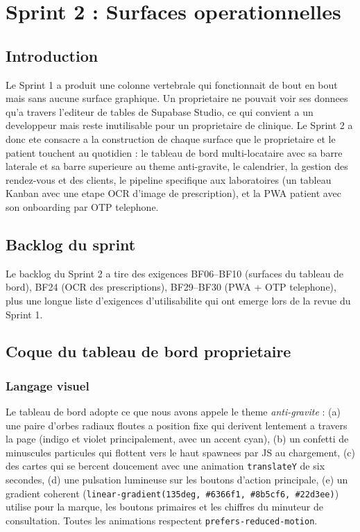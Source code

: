 \chapter{Sprint 2 : Surfaces operationnelles}

\section{Introduction}
Le Sprint 1 a produit une colonne vertebrale qui fonctionnait de bout en
bout mais sans aucune surface graphique. Un proprietaire ne pouvait voir
ses donnees qu'a travers l'editeur de tables de Supabase Studio, ce qui
convient a un developpeur mais reste inutilisable pour un proprietaire de
clinique. Le Sprint 2 a donc ete consacre a la construction de chaque
surface que le proprietaire et le patient touchent au quotidien : le
tableau de bord multi-locataire avec sa barre laterale et sa barre
superieure au theme anti-gravite, le calendrier, la gestion des
rendez-vous et des clients, le pipeline specifique aux laboratoires (un
tableau Kanban avec une etape OCR d'image de prescription), et la PWA
patient avec son onboarding par OTP telephone.

\section{Backlog du sprint}
Le backlog du Sprint 2 a tire des exigences BF06--BF10 (surfaces du
tableau de bord), BF24 (OCR des prescriptions), BF29--BF30 (PWA + OTP
telephone), plus une longue liste d'exigences d'utilisabilite qui ont
emerge lors de la revue du Sprint 1.

\section{Coque du tableau de bord proprietaire}

\subsection{Langage visuel}
Le tableau de bord adopte ce que nous avons appele le theme
\emph{anti-gravite} : (a) une paire d'orbes radiaux floutes a position
fixe qui derivent lentement a travers la page (indigo et violet
principalement, avec un accent cyan), (b) un confetti de minuscules
particules qui flottent vers le haut spawnees par JS au chargement, (c)
des cartes qui se bercent doucement avec une animation
\texttt{translateY} de six secondes, (d) une pulsation lumineuse sur les
boutons d'action principale, (e) un gradient coherent
(\texttt{linear-gradient(135deg, \#6366f1, \#8b5cf6, \#22d3ee)}) utilise
pour la marque, les boutons primaires et les chiffres du minuteur de
consultation. Toutes les animations respectent
\texttt{prefers-reduced-motion}.

